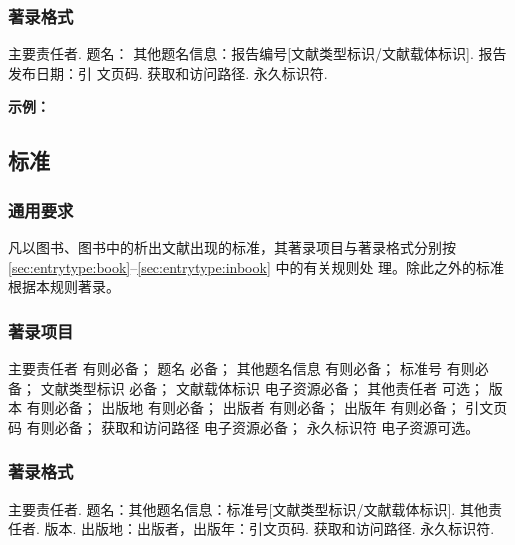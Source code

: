 \documentclass[twoside]{article}%
\begin{document}
\subsubsection{著录格式}
主要责任者. 题名： 其他题名信息：报告编号[文献类型标识/文献载体标识]. 报告发布日期：引
文页码. 获取和访问路径. 永久标识符.


\begin{refsection}

\nocite{中国互联网络信息中心2012--}
\nocite{汤万金2013-09-30--,中国宏观2020蓝皮书,美国疾病2018黄皮书,中国信息2023白皮书}
\nocite{Calkin2011-8-9}
\nocite{DTFHA1990--}
\nocite{WHO1970--,UN2024DT}


\textbf{示例：}

{\printbibliography[heading=none,env=indentegenv]}
\end{refsection}


\subsection{标准}

\subsubsection{通用要求}

凡以图书、图书中的析出文献出现的标准，其著录项目与著录格式分别按 \ref{sec:entrytype:book}--\ref{sec:entrytype:inbook} 中的有关规则处
理。除此之外的标准根据本规则著录。

\subsubsection{著录项目}

主要责任者 有则必备；
题名 必备；
其他题名信息 有则必备；
标准号 有则必备；
文献类型标识 必备；
文献载体标识 电子资源必备；
其他责任者 可选；
版本 有则必备；
出版地 有则必备；
出版者 有则必备；
出版年 有则必备；
引文页码 有则必备；
获取和访问路径 电子资源必备；
永久标识符 电子资源可选。

\subsubsection{著录格式}
主要责任者. 题名：其他题名信息：标准号[文献类型标识/文献载体标识]. 其他责任者. 版本.
出版地：出版者，出版年：引文页码. 获取和访问路径. 永久标识符.
\end{document}

